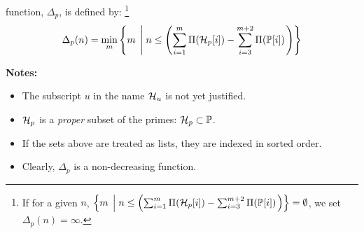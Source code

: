 \documentclass{article}
\theoremstyle{definition}
\begin{document}
 function, $\Delta_p$, is defined by:%
\footnote{If for a given $n$, 
$\left\{ m \; \left| \; n \le \left( \sum_{i=1}^m \Pi({\cal H}_p[i]) - \sum_{i=3}^{m+2} \Pi(\mathbb{P}[i]) \right. \right) \right\} = \emptyset$, we set $\Delta_p(n) = \infty$.}
\begin{eqnarray}
\Delta_p(n) = \mathop{\rm min}\limits_{m} \left\{ m \; \left| \; n \le \left( \sum_{i=1}^m \Pi({\cal H}_p[i]) - \sum_{i=3}^{m+2} \Pi(\mathbb{P}[i])\right. \right) \right\} 
\end{eqnarray}

\eject
{\bf Notes:} 
\begin{itemize}
  \item{The subscript $u$ in the name ${\cal H}_u$ is not yet justified.}
  \item{${\cal H}_p$ is a {\em proper\/} subset of the primes: ${\cal H}_p \subset \mathbb{P}$.}
  \item{If the sets above are treated as lists, they are indexed in sorted order.}
  \item{Clearly, $\Delta_p$ is a non-decreasing function.}
\end{itemize}
\end{document}
